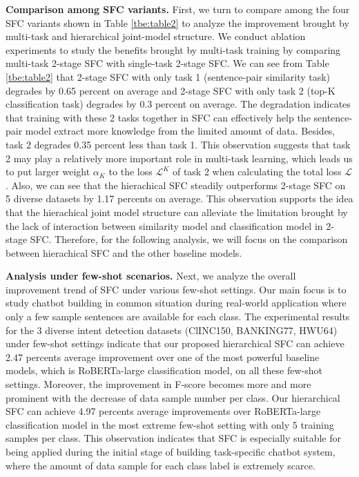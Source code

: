 \documentclass[letterpaper]{article} %
\begin{document}
  \textbf{Comparison  among  SFC  variants.} First, we turn to compare among the
  four  SFC  variants shown in Table \ref{tbe:table2} to analyze the improvement
  brought  by  multi-task  and  hierarchical  joint-model  structure. We conduct
  ablation  experiments  to study the benefits brought by multi-task training by
  comparing multi-task 2-stage SFC with single-task 2-stage SFC. We can see from
  Table  \ref{tbe:table2}  that  2-stage  SFC  with  only  task 1 (sentence-pair
  similarity task) degrades by 0.65 percent on average and 2-stage SFC with only
  task  2  (top-K  classification  task) degrades by 0.3 percent on average. The
  degradation  indicates  that  training  with these 2 tasks together in SFC can
  effectively  help  the  sentence-pair  model  extract  more knowledge from the
  limited  amount  of data. Besides, task 2 degrades 0.35 percent less than task
  1.  This observation suggests that task 2 may play a relatively more important
  role  in multi-task learning, which leads us to put larger weight $\alpha_{K}$
  to  the  loss  $\mathcal{L}^{K}$  of  task  2  when calculating the total loss
  $\mathcal{L}$.  Also, we can see that the hierachical SFC steadily outperforms
  2-stage  SFC  on  5  diverse  datasets  by  1.17  percents  on  average.  This
  observation  supports  the idea that the hierachical joint model structure can
  alleviate the limitation brought by the lack of interaction between similarity
  model  and  classification  model in 2-stage SFC. Therefore, for the following
  analysis,  we  will  focus  on  the comparison between hierachical SFC and the
  other baseline models.

  \textbf{Analysis  under  few-shot  scenarios.}  Next,  we  analyze the overall
  improvement trend of SFC under various few-shot settings. Our main focus is to
  study chatbot building in common situation during real-world application where
  only  a  few  sample  sentences are available for each class. The experimental
  results  for  the  3  diverse  intent detection datasets (ClINC150, BANKING77,
  HWU64) under few-shot settings indicate that our proposed hierarchical SFC can
  achieve  2.47  percents  average  improvement  over  one  of the most powerful
  baseline  models,  which  is  RoBERTa-large classification model, on all these
  few-shot  settings. Moreover, the improvement in F-score becomes more and more
  prominent  with the decrease of data sample number per class. Our hierarchical
  SFC   can  achieve  4.97  percents  average  improvements  over  RoBERTa-large
  classification model in the most extreme few-shot setting with only 5 training
  samples  per class. This observation indicates that SFC is especially suitable
  for  being  applied during the initial stage of building task-specific chatbot
  system,  where  the  amount  of  data sample for each class label is extremely
  scarce.
\end{document}
